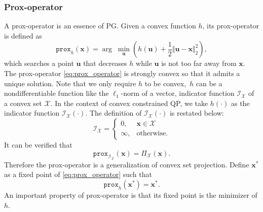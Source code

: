 \subsubsection{Prox-operator}
A prox-operator is an essence of PG.
Given a convex function $h$, its prox-operator is defined as
\begin{equation}
    \texttt{prox}_h(\bm x) = \arg \; \underset{\bm u}{\min}
    \left( h(\bm u) + \frac{1}{2} \Vert \bm u - \bm x \Vert_2^2 \right),
    \label{eq:prox_operator}
\end{equation}
which searches a point $\bm u$ that decreases $h$ while $\bm u$ is not too far
away from $\bm x$.
The prox-operator \eqref{eq:prox_operator} is strongly convex so that it
admits a unique solution.
Note that we only require $h$ to be convex, \ie \,$h$ can be a
nondifferentiable function like the $\ell_1$-norm of a vector, indicator
function $\mathcal I_{\mathcal X}$ of a convex set $\mathcal X$.
In the context of convex constrained QP, we take $h(\cdot)$ as the indicator
function $\mathcal I_{\mathcal X}(\cdot)$.
The definition of $\mathcal I_{\mathcal X}(\cdot)$ is restated below:
\begin{equation}
    \mathcal I_{\mathcal X} =
    \begin{cases} 0,      & \bm x \in \mathcal X\\
                  \infty, & \text{otherwise}.
    \end{cases}
\end{equation}
It can be verified that
\begin{equation}
    \texttt{prox}_{\mathcal I_{\mathcal X}}(\bm x) = \Pi_{\mathcal X}(\bm x).
\end{equation}
Therefore the prox-operator is a generalization of convex set projection.
Define $\bm x^*$ as a fixed point of \eqref{eq:prox_operator} such that
\begin{equation}
    \texttt{prox}_h(\bm x^*) = \bm x^*.
    \label{eq:proximal_optimal_condition}
\end{equation}
An important property of prox-operator is that its fixed point is the
minimizer of $h$.

